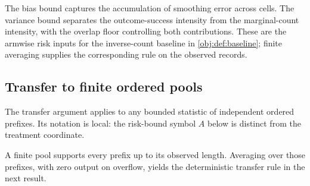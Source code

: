 \documentclass[11pt]{article}
\begin{document}
The bias bound captures the accumulation of smoothing error across cells. The variance bound separates the outcome-success intensity from the marginal-count intensity, with the overlap floor controlling both contributions. These are the armwise risk inputs for the inverse-count baseline in \cref{obj:def:baseline}; finite averaging supplies the corresponding rule on the observed records.

\subsection{Transfer to finite ordered pools}

The transfer argument applies to any bounded statistic of independent ordered prefixes. Its notation is local: the risk-bound symbol \(A\) below is distinct from the treatment coordinate.



A finite pool supports every prefix up to its observed length. Averaging over those prefixes, with zero output on overflow, yields the deterministic transfer rule in the next result.
\end{document}
